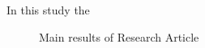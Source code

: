 \\
\\
In this study the 
\begin{figure}[h]
\begin{center}

\caption[Main results of Research Article ]{Main results of Research Article }
\label{fig:results3}
\end{center}
\end{figure}

